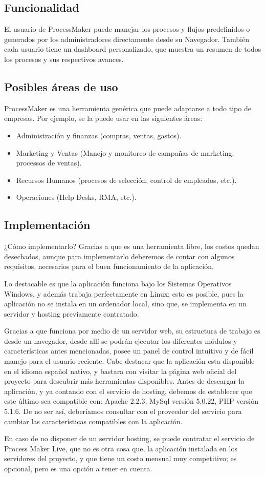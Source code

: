 \subsection{Funcionalidad}
El usuario de ProcessMaker puede manejar los procesos y flujos predefinidos o generados por los administradores directamente desde su Navegador. También cada usuario tiene un dashboard personalizado, que muestra un resumen de todos los procesos y sus respectivos avances.

\subsection{Posibles áreas de uso}
ProcessMaker es una herramienta genérica que puede adaptarse a todo tipo de empresas. Por ejemplo, se la puede usar en las siguientes áreas:
\begin{itemize}
\item Administración y finanzas (compras, ventas, gastos).
\item Marketing y Ventas (Manejo y monitoreo de campañas de marketing, processos de ventas).
\item Recursos Humanos (procesos de selección, control de empleados, etc.).
\item Operaciones (Help Desks, RMA, etc.).
\end{itemize}

\subsection{Implementaci\'on}

¿Cómo implementarlo? Gracias a que es una herramienta libre, los costos quedan desechados, aunque para implementarlo deberemos de contar con algunos requisitos, necesarios para el buen funcionamiento de la aplicación.

Lo destacable es que la aplicación funciona bajo los Sistemas Operativos Windows, y además trabaja perfectamente en Linux; esto es posible, pues la aplicación no se instala en un ordenador local, sino que, se implementa en un servidor y hosting previamente contratado.

Gracias a que funciona por medio de un servidor web, su estructura de trabajo es desde un navegador, desde allí se podrán ejecutar los diferentes módulos y características antes mencionadas, posee un panel de control intuitivo y de fácil manejo para el usuario reciente. Cabe destacar que la aplicación esta disponible en el idioma español nativo, y bastara con visitar la página web oficial del proyecto para descubrir más herramientas disponibles.
Antes de descargar la aplicación, y ya contando con el servicio de hosting, debemos de establecer que este último sea compatible con: Apache 2.2.3, MySql versión 5.0.22, PHP versión 5.1.6. De no ser así, deberíamos consultar con el proveedor del servicio para cambiar las características compatibles con la aplicación.

En caso de no disponer de un servidor hosting, se puede contratar el servicio de Process Maker Live, que no es otra cosa que, la aplicación instalada en los servidores del proyecto, y que tiene un costo mensual muy competitivo; es opcional, pero es una opción a tener en cuenta.







